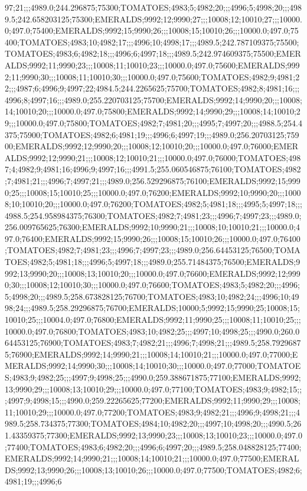 97;21;;;4989.0;244.296875;75300;TOMATOES;4983;5;4982;20;;;4996;5;4998;20;;;4989.5;242.658203125;75300;EMERALDS;9992;12;9990;27;;;10008;12;10010;27;;;10000.0;497.0;75400;EMERALDS;9992;15;9990;26;;;10008;15;10010;26;;;10000.0;497.0;75400;TOMATOES;4983;10;4982;17;;;4996;10;4998;17;;;4989.5;242.787109375;75500;TOMATOES;4983;6;4982;18;;;4996;6;4997;18;;;4989.5;242.974609375;75500;EMERALDS;9992;11;9990;23;;;10008;11;10010;23;;;10000.0;497.0;75600;EMERALDS;9992;11;9990;30;;;10008;11;10010;30;;;10000.0;497.0;75600;TOMATOES;4982;9;4981;22;;;4987;6;4996;9;4997;22;4984.5;244.2265625;75700;TOMATOES;4982;8;4981;16;;;4996;8;4997;16;;;4989.0;255.220703125;75700;EMERALDS;9992;14;9990;20;;;10008;14;10010;20;;;10000.0;497.0;75800;EMERALDS;9992;14;9990;29;;;10008;14;10010;29;;;10000.0;497.0;75800;TOMATOES;4982;7;4981;20;;;4995;7;4997;20;;;4988.5;254.4375;75900;TOMATOES;4982;6;4981;19;;;4996;6;4997;19;;;4989.0;256.20703125;75900;EMERALDS;9992;12;9990;20;;;10008;12;10010;20;;;10000.0;497.0;76000;EMERALDS;9992;12;9990;21;;;10008;12;10010;21;;;10000.0;497.0;76000;TOMATOES;4987;4;4982;9;4981;16;4996;9;4997;16;;;4991.5;255.060546875;76100;TOMATOES;4982;7;4981;21;;;4996;7;4997;21;;;4989.0;256.529296875;76100;EMERALDS;9992;15;9990;25;;;10008;15;10010;25;;;10000.0;497.0;76200;EMERALDS;9992;10;9990;20;;;10008;10;10010;20;;;10000.0;497.0;76200;TOMATOES;4982;5;4981;18;;;4995;5;4997;18;;;4988.5;254.958984375;76300;TOMATOES;4982;7;4981;23;;;4996;7;4997;23;;;4989.0;256.009765625;76300;EMERALDS;9992;10;9990;21;;;10008;10;10010;21;;;10000.0;497.0;76400;EMERALDS;9992;15;9990;26;;;10008;15;10010;26;;;10000.0;497.0;76400;TOMATOES;4982;7;4981;23;;;4996;7;4997;23;;;4989.0;256.64453125;76500;TOMATOES;4982;5;4981;18;;;4996;5;4997;18;;;4989.0;255.71484375;76500;EMERALDS;9992;13;9990;20;;;10008;13;10010;20;;;10000.0;497.0;76600;EMERALDS;9992;12;9990;30;;;10008;12;10010;30;;;10000.0;497.0;76600;TOMATOES;4983;5;4982;20;;;4996;5;4998;20;;;4989.5;258.673828125;76700;TOMATOES;4983;10;4982;24;;;4996;10;4998;24;;;4989.5;258.29296875;76700;EMERALDS;10000;5;9992;15;9990;25;10008;15;10010;25;;;10004.0;497.0;76800;EMERALDS;9992;11;9990;25;;;10008;11;10010;25;;;10000.0;497.0;76800;TOMATOES;4983;10;4982;25;;;4997;10;4998;25;;;4990.0;260.064453125;76900;TOMATOES;4983;7;4982;21;;;4996;7;4998;21;;;4989.5;258.79296875;76900;EMERALDS;9992;14;9990;21;;;10008;14;10010;21;;;10000.0;497.0;77000;EMERALDS;9992;14;9990;30;;;10008;14;10010;30;;;10000.0;497.0;77000;TOMATOES;4983;9;4982;25;;;4997;9;4998;25;;;4990.0;259.388671875;77100;EMERALDS;9992;13;9990;29;;;10008;13;10010;29;;;10000.0;497.0;77100;TOMATOES;4983;9;4982;15;;;4997;9;4998;15;;;4990.0;259.22265625;77200;EMERALDS;9992;11;9990;29;;;10008;11;10010;29;;;10000.0;497.0;77200;TOMATOES;4983;9;4982;21;;;4996;9;4998;21;;;4989.5;258.734375;77300;TOMATOES;4984;10;4982;20;;;4997;10;4998;20;;;4990.5;261.43359375;77300;EMERALDS;9992;13;9990;23;;;10008;13;10010;23;;;10000.0;497.0;77400;TOMATOES;4983;6;4982;20;;;4996;6;4997;20;;;4989.5;258.048828125;77400;EMERALDS;9992;14;9990;21;;;10008;14;10010;21;;;10000.0;497.0;77500;EMERALDS;9992;13;9990;26;;;10008;13;10010;26;;;10000.0;497.0;77500;TOMATOES;4982;6;4981;19;;;4996;6